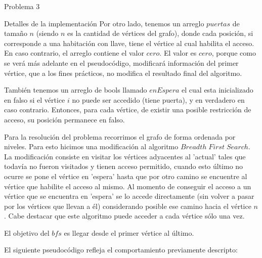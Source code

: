 \begin{section}{Problema 3}
\begin{subsection}{Detalles de la implementación}
		Por otro lado, tenemos un arreglo $puertas$ de tamaño $n$ (siendo $n$ es la cantidad de vértices del grafo), donde cada posición, si corresponde a una habitación con llave, tiene el vértice al cual habilita el acceso. En caso contrario, el arreglo contiene el valor $cero$. El valor es $cero$, porque como se verá más adelante en el pseudocódigo, modificará información del primer vértice, que a los fines prácticos, no modifica el resultado final del algoritmo.
		
		También tenemos un arreglo de bools llamado $enEspera$ el cual esta inicializado en falso si el vértice $i$ no puede ser accedido (tiene puerta), y en verdadero en caso contrario. Entonces, para cada vértice, de existir una posible restricción de acceso, su posición permanece en falso.

		Para la resolución del problema recorrimos el grafo de forma ordenada por niveles. Para esto hicimos una modificación al algoritmo $Breadth\; First\; Search$. La modificación consiste en visitar los vértices adyacentes al 'actual' tales que todavía no fueron visitados y tienen acceso permitido, cuando esto último no ocurre se pone el vértice en 'espera' hasta que por otro camino se encuentre al vértice que habilite el acceso al mismo. Al momento de conseguir el acceso a un vértice que se encuentra en 'espera' se lo accede directamente (sin volver a pasar por los vértices que llevan a él) considerando posible ese camino hacia el vértice $n$. Cabe destacar que este algoritmo puede acceder a cada vértice sólo una vez.

		El objetivo del $bfs$ es llegar desde el primer vértice al último.
		
		\newpage

		El siguiente pseudocódigo refleja el comportamiento previamente descripto:\VSP


\end{subsection}
\end{section}
